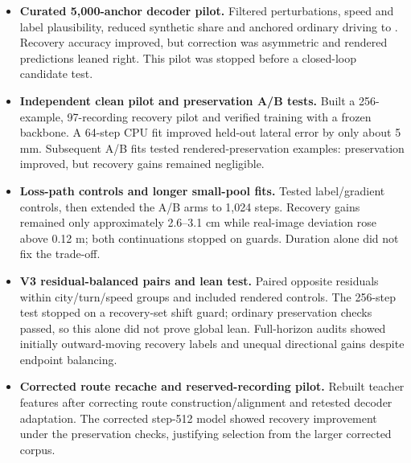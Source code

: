 \begin{itemize}
\item \textbf{Curated 5,000-anchor decoder pilot.} Filtered perturbations, speed and label plausibility, reduced synthetic share and anchored ordinary driving to \lf{}. Recovery accuracy improved, but correction was asymmetric and rendered predictions leaned right. This pilot was stopped before a closed-loop candidate test.
\item \textbf{Independent clean pilot and preservation A/B tests.} Built a 256-example, 97-recording recovery pilot and verified training with a frozen backbone. A 64-step CPU fit improved held-out lateral error by only about 5 mm. Subsequent A/B fits tested rendered-preservation examples: preservation improved, but recovery gains remained negligible.
\item \textbf{Loss-path controls and longer small-pool fits.} Tested label/gradient controls, then extended the A/B arms to 1,024 steps. Recovery gains remained only approximately 2.6--3.1 cm while real-image deviation rose above 0.12 m; both continuations stopped on guards. Duration alone did not fix the trade-off.
\item \textbf{V3 residual-balanced pairs and lean test.} Paired opposite residuals within city/turn/speed groups and included rendered controls. The 256-step test stopped on a recovery-set shift guard; ordinary preservation checks passed, so this alone did not prove global lean. Full-horizon audits showed initially outward-moving recovery labels and unequal directional gains despite endpoint balancing.
\item \textbf{Corrected route recache and reserved-recording pilot.} Rebuilt teacher features after correcting route construction/alignment and retested decoder adaptation. The corrected step-512 model showed recovery improvement under the preservation checks, justifying selection from the larger corrected corpus.

\end{itemize}
